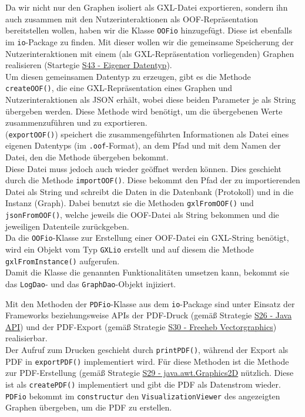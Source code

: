 \documentclass[enabledeprecatedfontcommands,fontsize=11pt,paper=a4,twoside]{scrartcl}
\newcounter{one}
\begin{document}
Da wir nicht nur den Graphen isoliert als GXL-Datei exportieren, sondern ihn auch zusammen mit den Nutzerinteraktionen als OOF-Repräsentation bereitstellen wollen, haben wir die Klasse \texttt{OOFio} hinzugefügt. Diese ist ebenfalls im \texttt{io}-Package zu finden. Mit dieser wollen wir die gemeinsame Speicherung der Nutzerinteraktionen mit einem (als GXL-Repräsentation vorliegenden) Graphen realisieren (Startegie \hyperlink{ooo}{S43 - Eigener Datentyp}). \\

Um diesen gemeinsamen Datentyp zu erzeugen, gibt es die Methode \texttt{createOOF()}, die eine GXL-Repräsentation eines Graphen und Nutzerinteraktionen als JSON erhält, wobei diese beiden Parameter je als String übergeben werden. Diese Methode wird benötigt, um die übergebenen Werte zusammenzuführen und zu exportieren. \\
(\texttt{exportOOF()}) speichert die zusammengeführten Informationen als Datei eines eigenen Datentyps (im \texttt{.oof}-Format), an dem Pfad und mit dem Namen der Datei, den die Methode übergeben bekommt. \\

Diese Datei muss jedoch auch wieder geöffnet werden können. Dies geschieht durch die Methode \texttt{importOOF()}. Diese bekommt den Pfad der zu importierenden Datei als String und schreibt die Daten in die Datenbank (Protokoll) und in die Instanz (Graph). Dabei benutzt sie die Methoden \texttt{gxlFromOOF()} und \texttt{jsonFromOOF()}, welche jeweils die OOF-Datei als String bekommen und die jeweiligen Datenteile zurückgeben. \\
Da die \texttt{OOFio}-Klasse zur Erstellung einer OOF-Datei ein GXL-String benötigt, wird ein Objekt vom Typ \texttt{GXLio} erstellt und auf diesem die Methode \texttt{gxlFromInstance()} aufgerufen.\\ 

Damit die Klasse die genannten Funktionalitäten umsetzen kann, bekommt sie das \texttt{LogDao}- und das \texttt{GraphDao}-Objekt injiziert. 

Mit den Methoden der \texttt{PDFio}-Klasse aus dem \texttt{io}-Package sind unter Einsatz der Frameworks beziehungsweise APIs der PDF-Druck (gemäß Strategie \hyperlink{ggg}{S26 - Java API}) und der PDF-Export (gemäß Strategie \hyperlink{iii}{S30 - Freeheb Vectorgraphics}) realisierbar. \\
Der Aufruf zum Drucken geschieht durch \texttt{printPDF()}, während der Export als PDF in \texttt{exportPDF()} implementiert wird. Für diese Methoden ist die Methode zur PDF-Erstellung (gemäß Strategie \hyperlink{hhh}{S29 - java.awt.Graphics2D} nützlich. Diese ist als \texttt{createPDF()} implementiert und gibt die PDF als Datenstrom wieder. \\
\texttt{PDFio} bekommt im \texttt{constructur} den \texttt{VisualizationViewer} des angezeigten Graphen übergeben, um die PDF zu erstellen. \\
\end{document}
